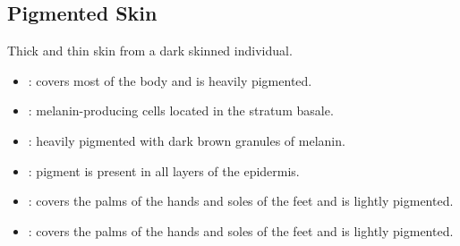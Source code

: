 \subsection{Pigmented Skin}
Thick and thin skin from a dark skinned individual.
\begin{center}
\end{center}
\begin{multicols}{2}
\begin{itemize}
  \item {}: covers most of the body and is heavily pigmented.
  
  \begin{center}
  \end{center}
  
  \item {}: melanin-producing cells located in the stratum basale. 
  
  \begin{center}
  \end{center}
  
  \item {}: heavily pigmented with dark brown granules of melanin.
  
  \begin{center}
  \end{center}
   
  \item {}: pigment is present in all layers of the epidermis.
  
  \begin{center}
  \end{center}
  
  \item {}:  covers the palms of the hands and soles of the feet and is lightly pigmented.
  
  \begin{center}
  \end{center}
  
  \item {}:  covers the palms of the hands and soles of the feet and is lightly pigmented.
  
  \begin{center}
  \end{center}
  

\end{itemize}
\end{multicols}

